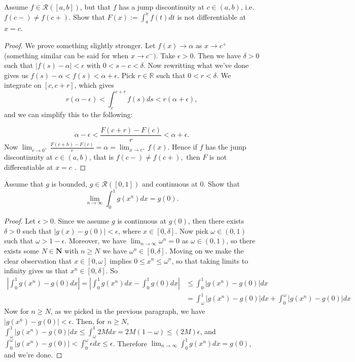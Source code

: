 \documentclass[oneside]{amsart}
\theoremstyle{definition}
\newcommand{\rr}{\mathbb R}
\newcommand{\nn}{\mathbf N}
\begin{document}
\begin{tcolorbox}[colback=black!5!white,colframe=black!75!black,title= Exercise $2.5.$]  Assume $f \in \mathcal R([a,b])$, but that $f$ has a jump discontinuity at $c \in (a,b)$, i.e. $f(c-) \neq f(c+)$. Show that $F(x):=\int_a^x f(t) dt$ is not differentiable at $x = c$.  
\tcblower 
\begin{proof} We prove something slightly stronger. Let $f(x) \to \alpha$ as $x \to c^+$ (something similar can be said for when $x \to c^-)$. Take $\epsilon > 0$. Then we have $\delta > 0$ such that $|f(s) - \alpha | < \epsilon$ with $0 < s-c < \delta$. Now rewritting what we've done gives us $f(s) - \alpha < f(s) < \alpha + \epsilon$. Pick $r \in \rr$ such that $0 < r < \delta$. We integrate on $[c, c+r]$, which gives 
$$
r(\alpha - \epsilon) < \int_{c}^{c+r} f(s) ds < r(\alpha +\epsilon),
$$ and we can simplify this to the following:

$$ \alpha - \epsilon < \frac{F(c+r)-F(c)}{r} < \alpha + \epsilon .$$ Now $\lim_{r \to 0^+} \frac{F(c+h)-F(c)}{r} = \alpha = \lim_{x \to c^+} f(x)$. Hence if $f$ has the jump discontinuity at $c \in (a,b)$, that is $f(c-) \neq f(c+),$ then $F$ is not differentiable at $x =c$ .
\end{proof}
\end{tcolorbox}


\begin{tcolorbox}[colback=black!5!white,colframe=black!75!black,title= Exercise $2.7.$] Assume that $g$ is bounded, $g \in \mathcal R([0,1])$ and continuous at $0$. Show that 
\[
\lim_{n \to \infty} \int_0^1 g(x^n) dx = g(0).
\] 
\tcblower 
\begin{proof} Let $\epsilon > 0$. Since we assume $g$ is continuous at $ g(0)$, then there exists $\delta > 0$ such that  $|g(x) - g(0)| < \epsilon$, where $x \in [0,\delta]$. Now pick $\omega \in (0,1)$ such that $\omega > 1- \epsilon$. Moreover, we have $ \lim_{n \to \infty} \omega^n = 0$ as $\omega \in (0,1)$, so there exists some $N \in \nn$ with $n \geq N$ we have  $\omega^n \in [0, \delta]$. Moving on we make the clear observation that $x \in [0,\omega]$ implies $0 \leq x^n \leq \omega^n$, so that taking limits to infinity gives us that $x^n \in [0, \delta]$. So
\begin{align*}
	\left | \int_0^1 g(x^n) - g(0) dx\right | = \left | \int_0^1 g(x^n)dx  - \int_0^1 g(0) dx \right|  & \leq \int_0^1 \left |g(x^n)-g(0) \right| dx \\ & =  \int_\omega^1 |g(x^n)-g(0)|dx + \int_0^\omega |g(x^n)-g(0)|dx 
\end{align*} Now for $ n \geq N$, as we picked in the previous paragraph, we have $|g(x^n) - g(0)| < \epsilon$. Then, for $n \geq N$, $\int_\omega^1 |g(x^n) - g(0)| dx \leq \int_\omega^1 2M dx = 2M(1- \omega) \leq (2M) \epsilon$, and $\int_0^\omega |g(x^n)-g(0)| < \int_0^\omega \epsilon dx \leq \epsilon$. Therefore $\lim_{n \to \infty} \int_0^1 g(x^n) dx = g(0)$, and we're done.
\end{proof}
\end{tcolorbox}
\end{document}
